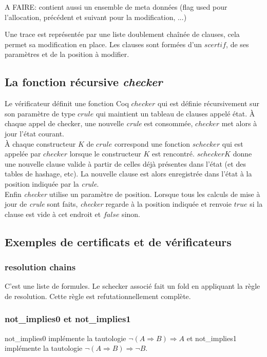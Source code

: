 \documentclass[11pt]{article}
\begin{document}
A FAIRE: contient aussi un ensemble de meta données (flag used pour l'allocation, précédent et suivant pour la modification, ...)

Une trace est représentée par une liste doublement chaînée de clauses, cela permet sa modification en place. Les clauses sont formées d'un $scertif$, de ses paramètres et de la position à modifier.

\subsection{La fonction récursive \textit{checker}} \label{checker}

Le vérificateur définit une fonction Coq $checker$ qui est définie récursivement sur son paramètre de type $crule$ qui maintient un tableau de clauses appelé état. À chaque appel de checker, une nouvelle \textit{crule} est consommée, $checker$ met alors à jour l'état courant.\\

À chaque constructeur $K$ de $crule$ correspond une fonction $schecker$ qui est appelée par $checker$ lorsque le constructeur $K$ est rencontré. $scheckerK$ donne une nouvelle clause valide à partir de celles déjà présentes dans l'état (et des tables de hashage, etc). La nouvelle clause est alors enregistrée dans l'état à la position indiquée par la \textit{crule}.\\


Enfin \textit{checker} utilise un paramètre de position. Lorsque tous les calculs de mise à jour de \textit{crule} sont faits, \textit{checker} regarde à la position indiquée et renvoie $true$ si la clause est vide à cet endroit et $false$ sinon.

\subsection{Exemples de certificats et de vérificateurs}

\subsubsection{resolution chains}

C'est une liste de formules. Le schecker associé fait un fold en appliquant la règle de resolution. Cette règle est refutationnellement complète.

\subsubsection{not\_implies0 et not\_implies1}
not\_implies0 implémente la tautologie $\neg (A \Rightarrow B) \Rightarrow A$ et not\_implies1 implémente la tautologie $\neg (A \Rightarrow B) \Rightarrow \neg B$. \\
\end{document}
